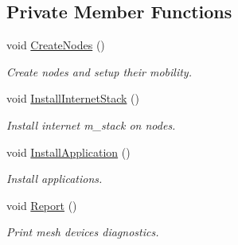 \subsection*{Private Member Functions}
\begin{DoxyCompactItemize}
\item 
void \hyperlink{classMeshTest_aa1eb18d555ebcf925e9bdc13e4e57ee0}{Create\+Nodes} ()
\begin{DoxyCompactList}\small\item\em Create nodes and setup their mobility. \end{DoxyCompactList}\item 
void \hyperlink{classMeshTest_a43bfeb98362be8a2d7d16f49939e4ea5}{Install\+Internet\+Stack} ()
\begin{DoxyCompactList}\small\item\em Install internet m\+\_\+stack on nodes. \end{DoxyCompactList}\item 
void \hyperlink{classMeshTest_af3cc96a4ae76dc2de2909d19817e6c64}{Install\+Application} ()
\begin{DoxyCompactList}\small\item\em Install applications. \end{DoxyCompactList}\item 
void \hyperlink{classMeshTest_aceb70a8a164043db7a4249e239d07841}{Report} ()
\begin{DoxyCompactList}\small\item\em Print mesh devices diagnostics. \end{DoxyCompactList}\end{DoxyCompactItemize}
